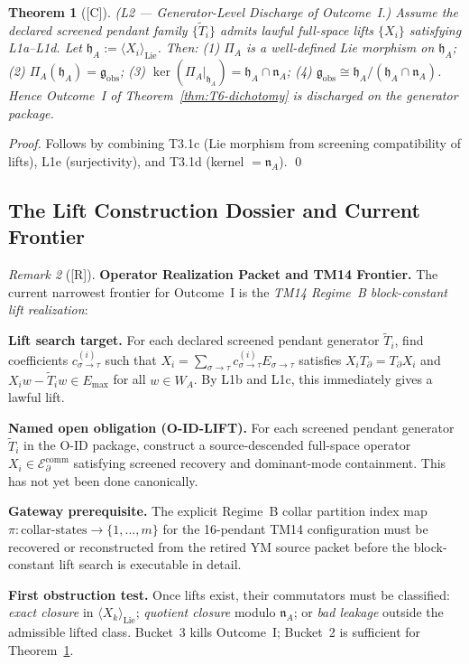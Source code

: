\documentclass[12pt,oneside]{amsbook}
\theoremstyle{plain}
\newtheorem{theorem}{Theorem}[section]
\theoremstyle{definition}
\theoremstyle{remark}
\newtheorem{remark}[theorem]{Remark}
\newcommand{\status}[1]{\textup{[#1]}}
\begin{document}
\begin{theorem}[\status{C}]\label{thm:L2-generator-discharge}
\textup{(L2 --- Generator-Level Discharge of Outcome~I.)}
Assume the declared screened pendant family $\{\widetilde{T}_i\}$ admits lawful
full-space lifts $\{X_i\}$ satisfying L1a--L1d. Let
$\mathfrak{h}_A := \langle X_i \rangle_{\mathrm{Lie}}$. Then:
\textup{(1)} $\Pi_A$ is a well-defined Lie morphism on $\mathfrak{h}_A$;
\textup{(2)} $\Pi_A(\mathfrak{h}_A) = \mathfrak{g}_{\mathrm{obs}}$;
\textup{(3)} $\ker(\Pi_A|_{\mathfrak{h}_A}) = \mathfrak{h}_A \cap \mathfrak{n}_A$;
\textup{(4)} $\mathfrak{g}_{\mathrm{obs}} \cong
\mathfrak{h}_A / (\mathfrak{h}_A \cap \mathfrak{n}_A)$.
Hence Outcome~I of Theorem~\ref{thm:T6-dichotomy} is discharged on the
generator package.
\end{theorem}

\begin{proof}
Follows by combining T3.1c (Lie morphism from screening compatibility of lifts),
L1e (surjectivity), and T3.1d (kernel $= \mathfrak{n}_A$). \qed
\end{proof}

\subsection{The Lift Construction Dossier and Current Frontier}

\begin{remark}[\status{R}]\label{rem:lift-dossier}
\textbf{Operator Realization Packet and TM14 Frontier.}
The current narrowest frontier for Outcome~I is the \emph{TM14 Regime~B
block-constant lift realization}:

\medskip
\noindent\textbf{Lift search target.}
For each declared screened pendant generator $\widetilde{T}_i$, find coefficients
$c_{\sigma\to\tau}^{(i)}$ such that
$X_i = \sum_{\sigma\to\tau} c_{\sigma\to\tau}^{(i)} E_{\sigma\to\tau}$
satisfies $X_i T_\partial = T_\partial X_i$ and
$X_i w - \widetilde{T}_i w \in E_{\max}$ for all $w \in W_A$.
By L1b and L1c, this immediately gives a lawful lift.

\medskip
\noindent\textbf{Named open obligation (O-ID-LIFT).}
For each screened pendant generator $\widetilde{T}_i$ in the O-ID package,
construct a source-descended full-space operator $X_i \in
\mathcal{E}_\partial^{\mathrm{comm}}$ satisfying screened recovery and dominant-mode
containment. This has not yet been done canonically.

\medskip
\noindent\textbf{Gateway prerequisite.}
The explicit Regime~B collar partition index map
$\pi : \mathrm{collar\text{-}states} \to \{1,\ldots,m\}$ for the 16-pendant TM14
configuration must be recovered or reconstructed from the retired YM source packet
before the block-constant lift search is executable in detail.

\medskip
\noindent\textbf{First obstruction test.}
Once lifts exist, their commutators must be classified:
\emph{exact closure} in $\langle X_k \rangle_{\mathrm{Lie}}$;
\emph{quotient closure} modulo $\mathfrak{n}_A$;
or \emph{bad leakage} outside the admissible lifted class.
Bucket~3 kills Outcome~I; Bucket~2 is sufficient for Theorem~\ref{thm:L2-generator-discharge}.
\end{remark}
\end{document}

